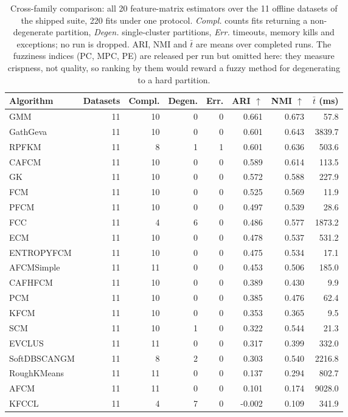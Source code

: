 \documentclass[twoside,11pt]{article}
\begin{document}
\begin{table}[t]
\centering
\small
\caption{Cross-family comparison: all 20 feature-matrix estimators over the 11
offline datasets of the shipped suite, 220 fits under one protocol.
\emph{Compl.} counts fits returning a non-degenerate partition, \emph{Degen.}
single-cluster partitions, \emph{Err.} timeouts, memory kills and exceptions;
no run is dropped. ARI, NMI and $\bar{t}$ are means over completed runs. The
fuzziness indices (PC, MPC, PE) are released per run but omitted here: they
measure crispness, not quality, so ranking by them would reward a fuzzy
method for degenerating to a hard partition.}
\label{tab:main-benchmark}
\begin{tabular}{lrrrrrrr}
\toprule
Algorithm & Datasets & Compl. & Degen. & Err. & ARI $\uparrow$ & NMI $\uparrow$ & $\bar{t}$ (ms) \\
\midrule
GMM & 11 & 10 & 0 & 0 & 0.661 & 0.673 & 57.8 \\
GathGeva & 11 & 10 & 0 & 0 & 0.601 & 0.643 & 3839.7 \\
RPFKM & 11 & 8 & 1 & 1 & 0.601 & 0.636 & 503.6 \\
CAFCM & 11 & 10 & 0 & 0 & 0.589 & 0.614 & 113.5 \\
GK & 11 & 10 & 0 & 0 & 0.572 & 0.588 & 227.9 \\
FCM & 11 & 10 & 0 & 0 & 0.525 & 0.569 & 11.9 \\
PFCM & 11 & 10 & 0 & 0 & 0.497 & 0.539 & 28.6 \\
FCC & 11 & 4 & 6 & 0 & 0.486 & 0.577 & 1873.2 \\
ECM & 11 & 10 & 0 & 0 & 0.478 & 0.537 & 531.2 \\
ENTROPYFCM & 11 & 10 & 0 & 0 & 0.475 & 0.534 & 17.1 \\
AFCMSimple & 11 & 11 & 0 & 0 & 0.453 & 0.506 & 185.0 \\
CAFHFCM & 11 & 10 & 0 & 0 & 0.389 & 0.430 & 9.9 \\
PCM & 11 & 10 & 0 & 0 & 0.385 & 0.476 & 62.4 \\
KFCM & 11 & 10 & 0 & 0 & 0.353 & 0.365 & 9.5 \\
SCM & 11 & 10 & 1 & 0 & 0.322 & 0.544 & 21.3 \\
EVCLUS & 11 & 11 & 0 & 0 & 0.317 & 0.399 & 332.0 \\
SoftDBSCANGM & 11 & 8 & 2 & 0 & 0.303 & 0.540 & 2216.8 \\
RoughKMeans & 11 & 11 & 0 & 0 & 0.137 & 0.294 & 802.7 \\
AFCM & 11 & 11 & 0 & 0 & 0.101 & 0.174 & 9028.0 \\
KFCCL & 11 & 4 & 7 & 0 & -0.002 & 0.109 & 341.9 \\
\bottomrule
\end{tabular}
\end{table}
\end{document}
